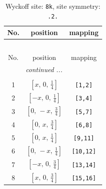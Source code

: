 \documentclass[fleqn,8pt]{jsarticle}
\begin{document}
\begin{longtable}{ccc}
\caption{Wyckoff site: {\tt 8k}, site symmetry: {\tt .2.}}
 \\
 \hline \hline
No. & position & mapping \\ \hline \endfirsthead

\multicolumn{2}{l}{\tablename\ \thetable{}} \\
 \hline \hline
No. & position & mapping \\ \hline \endhead

 \hline \hline
\multicolumn{2}{r}{\footnotesize\it continued ...} \\ \endfoot

 \hline \hline
\multicolumn{2}{r}{} \\ \endlastfoot

1 & $\left[ x,\, 0,\, \frac{1}{4} \right]$ & {\tt [1,2]} \\ \hline
2 & $\left[ - x,\, 0,\, \frac{1}{4} \right]$ & {\tt [3,4]} \\ \hline
3 & $\left[ 0,\, - x,\, \frac{3}{4} \right]$ & {\tt [5,7]} \\ \hline
4 & $\left[ 0,\, x,\, \frac{3}{4} \right]$ & {\tt [6,8]} \\ \hline
5 & $\left[ 0,\, x,\, \frac{1}{4} \right]$ & {\tt [9,11]} \\ \hline
6 & $\left[ 0,\, - x,\, \frac{1}{4} \right]$ & {\tt [10,12]} \\ \hline
7 & $\left[ - x,\, 0,\, \frac{3}{4} \right]$ & {\tt [13,14]} \\ \hline
8 & $\left[ x,\, 0,\, \frac{3}{4} \right]$ & {\tt [15,16]} \\
\end{longtable}
\renewcommand{\arraystretch}{1.2}
\end{document}
